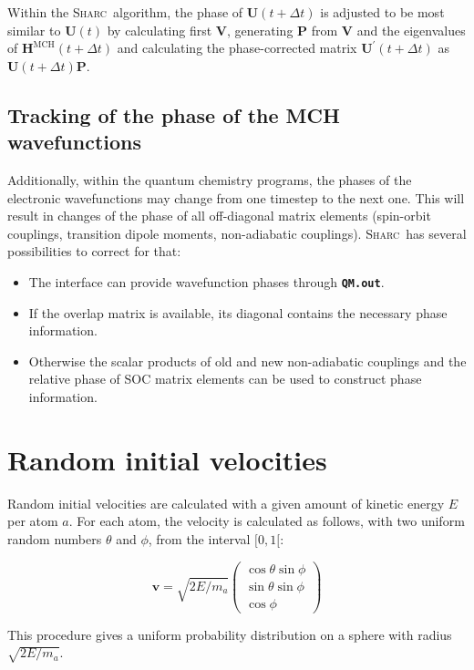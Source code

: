 \documentclass[a4paper,11pt,DIV=15,openany,twoside=false]{scrbook}
\newcommand{\ttmdump}[1]{#1}
\newcommand{\sharc}{\textsc{Sharc}}
\newcommand{\ttt}[1]{\textbf{\texttt{#1}}}
\newcommand{\VEC}[1]{\ensuremath{\mathbf{#1}}}
\begin{document}
Within the \sharc\ algorithm, the phase of $\VEC{U}(t+\Delta t)$ is adjusted to be most similar to $\VEC{U}(t)$ by calculating first $\VEC{V}$, generating $\VEC{P}$ from $\VEC{V}$ and the eigenvalues of $\VEC{H}^{\text{MCH}}(t+\Delta t)$ and calculating the phase-corrected matrix $\VEC{U}^\prime(t+\Delta t)$ as $\VEC{U}(t+\Delta t)\VEC{P}$.

\subsection{Tracking of the phase of the MCH wavefunctions}

Additionally, within the quantum chemistry programs, the phases of the electronic wavefunctions may change from one timestep to the next one. This will result in changes of the phase of all off-diagonal matrix elements (spin-orbit couplings, transition dipole moments, non-adiabatic couplings). \sharc\ has several possibilities to correct for that:
\begin{itemize}
  \item The interface can provide wavefunction phases through \ttt{QM.out}.
  \item If the overlap matrix is available, its diagonal contains the necessary phase information.
  \item Otherwise the scalar products of old and new non-adiabatic couplings and the relative phase of SOC matrix elements can be used to construct phase information.
\end{itemize}


\section{Random initial velocities}\label{met:veloc}

Random initial velocities are calculated with a given amount of kinetic energy $E$ per atom $a$. For each atom, the velocity is calculated as follows, with two uniform random numbers $\theta$ and $\phi$, from the interval $[0,1[$:
\ttmdump{
  \begin{equation}
    \VEC{v}=\sqrt{2E/m_a}
    \begin{pmatrix}
      \cos{\theta}\sin{\phi}\\
      \sin{\theta}\sin{\phi}\\
      \cos{\phi}
    \end{pmatrix}
  \end{equation}
}
This procedure gives a uniform probability distribution on a sphere with radius $\sqrt{2E/m_a}$.
\end{document}
